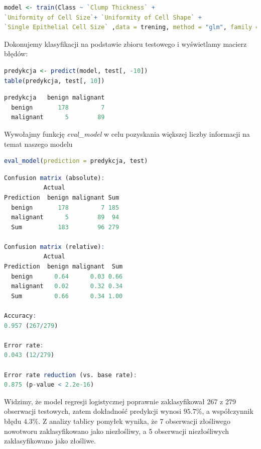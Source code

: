 \documentclass[a4paper]{article}
\begin{document}
\begin{lstlisting}[language=R, frame=single]
model <- train(Class ~ `Clump Thickness` + 
`Uniformity of Cell Size`+ `Uniformity of Cell Shape` + 
`Single Epithelial Cell Size` ,data = trening, method = "glm", family = "binomial")
\end{lstlisting}
Dokonujemy klasyfikacji na podstawie zbioru testowego i wyświetlamy macierz błędów:
\begin{lstlisting}[language=R, frame=single]
predykcja <- predict(model, test[, -10])
table(predykcja, test[, 10])
\end{lstlisting}\newpage
\begin{lstlisting}[language=R, frame=single]
predykcja   benign malignant
  benign       178         7
  malignant      5        89
\end{lstlisting}
 Wywołajmy funkcję \textit{eval\_model} w celu pozyskania większej liczby informacji na temat naszego modelu
\begin{lstlisting}[language=R, frame = single]
eval_model(prediction = predykcja, test)
\end{lstlisting}
\begin{lstlisting}[language=R, frame=single]
Confusion matrix (absolute):
           Actual
Prediction  benign malignant Sum
  benign       178         7 185
  malignant      5        89  94
  Sum          183        96 279

Confusion matrix (relative):
           Actual
Prediction  benign malignant  Sum
  benign      0.64      0.03 0.66
  malignant   0.02      0.32 0.34
  Sum         0.66      0.34 1.00

Accuracy:
0.957 (267/279)

Error rate:
0.043 (12/279)

Error rate reduction (vs. base rate):
0.875 (p-value < 2.2e-16)
\end{lstlisting}
Widzimy, że model regresji logistycznej poprawnie zaklasyfikował 267 z 279 obserwacji testowych, zatem dokładność predykcji wynosi $95.7\%$, a współczynnik błędu $4.3\%$. Z analizy tablicy pomyłek wynika, że 7 obserwacji złośliwego nowotworu zaklasyfikowano jako niezłośliwy, a 5 obserwacji niezłośliwych zaklasyfikowano jako złośliwe. 
\end{document}
